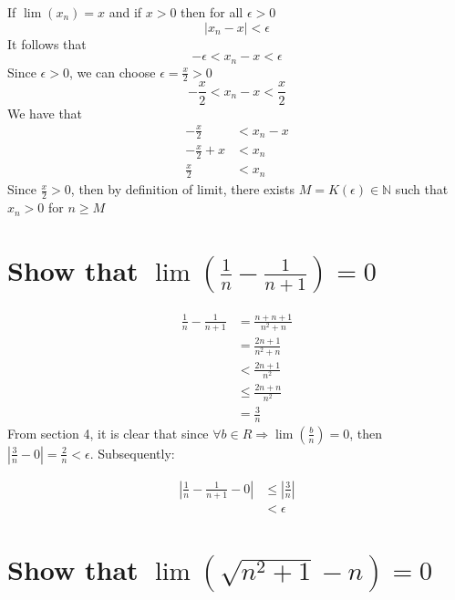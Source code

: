 \documentclass{article}
\begin{document}
If $\lim(x_n) = x$ and if $x > 0$ then for all $\epsilon > 0$
\begin{equation*}
    |x_n - x| < \epsilon 
\end{equation*}
It follows that 
\begin{equation*}
    -\epsilon < x_n - x < \epsilon 
\end{equation*}
Since $\epsilon > 0$, we can choose $\epsilon = \frac{x}{2} > 0$
\begin{equation*}
    -\frac{x}{2} < x_n - x < \frac{x}{2}
\end{equation*}
We have that 
\begin{align*}
    -\frac{x}{2} & < x_n - x \\
    -\frac{x}{2} + x & < x_n \\
    \frac{x}{2} & < x_n
\end{align*}
Since $\frac{x}{2} > 0$, then by definition of limit, there exists $M = K(\epsilon) \in \mathbb{N}$ such that $x_n > 0$ for $n \ge M$

\section{Show that $\lim(\frac{1}{n} - \frac{1}{n + 1}) = 0$}

\begin{align*}
    \frac{1}{n} - \frac{1}{n + 1} & = \frac{n + n + 1}{n^2 + n} \\
                                  & = \frac{2n + 1}{n^2 + n} \\
                                  & < \frac{2n + 1}{n^2} \\
                                  & \le \frac{2n + n}{n^2} \\
                                  & = \frac{3}{n} 
\end{align*}    
From section 4, it is clear that since $\forall b \in R \Rightarrow \lim(\frac{b}{n}) = 0$, then $| \frac{3}{n} - 0 | = \frac{2}{n} < \epsilon$. 
Subsequently:

\begin{align*}
    |\frac{1}{n} - \frac{1}{n + 1} - 0| & \le |\frac{3}{n} | \\
                                        & < \epsilon
\end{align*}

\section{Show that $\lim(\sqrt{n^2 + 1} - n) = 0$}
\end{document}
